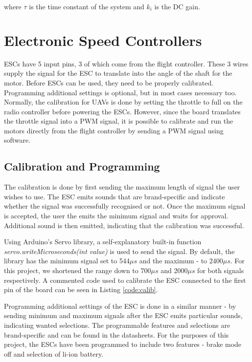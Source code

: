 where $\tau$ is the time constant of the system and $k_{i}$ is the DC gain. 

\section{Electronic Speed Controllers}
ESCs have 5 input pins, 3 of which come from the flight controller. These 3 wires supply the signal for the ESC to translate into the angle of the shaft for the motor. Before ESCs can be used, they need to be properly calibrated. Programming additional settings is optional, but in most cases necessary too. Normally, the calibration for UAVs is done by setting the throttle to full on the radio controller before powering the ESCs. However, since the board translates the throttle signal into a PWM signal, it is possible to calibrate and run the motors directly from the flight controller by sending a PWM signal using software.

\subsection{Calibration and Programming}
The calibration is done by first sending the maximum length of signal the user wishes to use. The ESC emits sounds that are brand-specific and indicate whether the signal was successfully recognised or not. Once the maximum signal is accepted, the user the emits the minimum signal and waits for approval. Additional sound is then emitted, indicating that the calibration was successful.

Using Arduino's Servo library, a self-explanatory built-in function \textit{servo.writeMicroseconds(int value)} is used to send the signal. By default, the library has the minimum signal set to 544$\mu s$ and the maximum - to 2400$\mu s$. For this project, we shortened the range down to 700$\mu s$ and 2000$\mu s$ for both signals respectively. A commented code used to calibrate the ESC connected to the first pin of the board can be seen in Listing \ref{code:calib}.



Programming additional settings of the ESC is done in a similar manner - by sending minimum and maximum signals after the ESC emits particular sounds, indicating wanted selections. The programmable features and selections are brand-specific and can be found in the datasheets. For the purposes of this project, the ESCs have been programmed to include two features - brake mode off and selection of li-ion battery.

